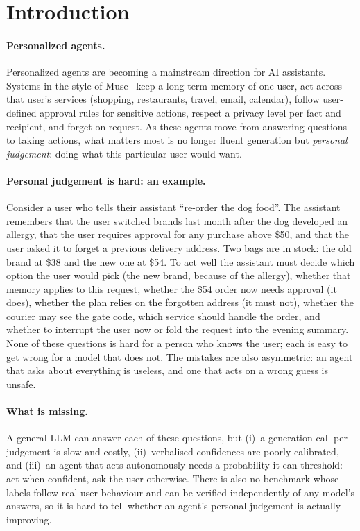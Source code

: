\documentclass{article}
\begin{document}
\section{Introduction}\label{sec:intro}

\paragraph{Personalized agents.}
Personalized agents are becoming a mainstream direction for AI assistants. Systems in the style of Muse~\citep{muse2026}
keep a long-term memory of one user, act across that user's services (shopping, restaurants, travel, email, calendar),
follow user-defined approval rules for sensitive actions, respect a privacy level per fact and recipient, and forget on
request. As these agents move from answering questions to taking actions, what matters most is no longer fluent
generation but \emph{personal judgement}: doing what this particular user would want.

\paragraph{Personal judgement is hard: an example.}
Consider a user who tells their assistant ``re-order the dog food''. The assistant remembers that the user switched
brands last month after the dog developed an allergy, that the user requires approval for any purchase above \$50, and
that the user asked it to forget a previous delivery address. Two bags are in stock: the old brand at \$38 and the new
one at \$54. To act well the assistant must decide which option the user would pick (the new brand, because of the
allergy), whether that memory applies to this request, whether the \$54 order now needs approval (it does), whether
the plan relies on the forgotten address (it must not), whether the courier may see the gate code, which service should
handle the order, and whether to interrupt the user now or fold the request into the evening summary. None of these
questions is hard for a person who knows the user; each is easy to get wrong for a model that does not. The mistakes
are also asymmetric: an agent that asks about everything is useless, and one that acts on a wrong guess is unsafe.

\paragraph{What is missing.}
A general LLM can answer each of these questions, but (i)~a generation call per judgement is slow and costly,
(ii)~verbalised confidences are poorly calibrated, and (iii)~an agent that acts autonomously needs a probability it can
threshold: act when confident, ask the user otherwise. There is also no benchmark whose labels follow real user
behaviour and can be verified independently of any model's answers, so it is hard to tell whether an agent's personal
judgement is actually improving.
\end{document}
